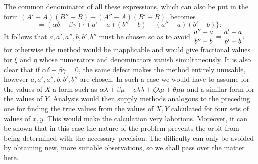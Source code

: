 The common denominator of all these expressions, which can also be put in the form $(A'-A)(B''-B)-(A''-A)(B'-B)$, becomes
\[
=(\alpha\delta-\beta\gamma)\{(a'-a)(b''-b)-(a''-a)(b'-b)\}:
\]
It follows that $a,a',a'',b,b',b''$ must be chosen so as to avoid $\dfrac{a''-a}{b''-b}=\dfrac{a'-a}{b'-b}\mathpunct{\raisebox{.45ex}{,}}$ for otherwise the method would be inapplicable and would give fractional values for $\xi$ and $\eta$ whose numerators and denominators vanish simultaneously. It is also clear that if $\alpha\delta-\beta\gamma=0$, the same defect makes the method entirely unusable, however $a,a',a'',b,b',b''$ are chosen. In such a case we would have to assume for the values of $X$ a form such as $\alpha\lambda+\beta\mu+\epsilon\lambda\lambda+\zeta\lambda\mu+\theta\mu\mu$ and a similar form for the values of $Y$. Analysis would then supply methods analogous to the preceding one for finding the true values from the values of $X,Y$ calculated for four sets of values of $x,y$. This would make the calculation very laborious. Moreover, it can be shown that in this case the nature of the problem prevents the orbit from being determined with the necessary precision. The difficulty can only be avoided by obtaining new, more suitable observations, so we shall pass over the matter here.
